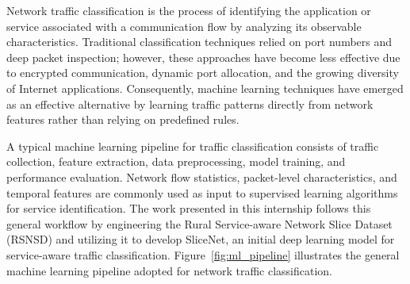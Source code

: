 \documentclass[12pt,a4paper]{report}
\begin{document}
	Network traffic classification is the process of identifying the application or service associated with a communication flow by analyzing its observable characteristics. Traditional classification techniques relied on port numbers and deep packet inspection; however, these approaches have become less effective due to encrypted communication, dynamic port allocation, and the growing diversity of Internet applications. Consequently, machine learning techniques have emerged as an effective alternative by learning traffic patterns directly from network features rather than relying on predefined rules.
	
	A typical machine learning pipeline for traffic classification consists of traffic collection, feature extraction, data preprocessing, model training, and performance evaluation. Network flow statistics, packet-level characteristics, and temporal features are commonly used as input to supervised learning algorithms for service identification. The work presented in this internship follows this general workflow by engineering the Rural Service-aware Network Slice Dataset (RSNSD) and utilizing it to develop SliceNet, an initial deep learning model for service-aware traffic classification. Figure~\ref{fig:ml_pipeline} illustrates the general machine learning pipeline adopted for network traffic classification.
	
\end{document}
